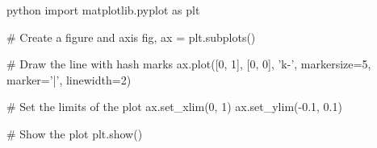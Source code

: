 python
import matplotlib.pyplot as plt

# Create a figure and axis
fig, ax = plt.subplots()

# Draw the line with hash marks
ax.plot([0, 1], [0, 0], 'k-', markersize=5, marker='|', linewidth=2)

# Set the limits of the plot
ax.set_xlim(0, 1)
ax.set_ylim(-0.1, 0.1)

# Show the plot
plt.show()
